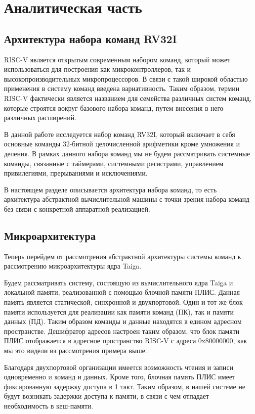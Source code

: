 \section{Аналитическая часть}

\subsection{Архитектура набора команд RV32I}
RISC-V является открытым современным набором команд, который может использоваться для построения как микроконтроллеров, так и высокопроизводительных микропроцессоров. В связи с такой широкой областью применения в систему команд введена вариативность. Таким образом, термин RISC-V фактически является названием для семейства различных систем команд, которые строятся вокруг базового набора команд, путем внесения в него различных расширений.

В данной работе исследуется набор команд RV32I, который включает в себя основные команды 32-битной целочисленной арифметики кроме умножения и деления. В рамках данного набора команд мы не будем рассматривать системные команды, связанные с таймерами, системными регистрами, управлением привилегиями, прерываниями и исключениями.

В настоящем разделе описывается архитектура набора команд, то есть архитектура абстрактной вычислительной машины с точки зрения набора команд без связи с конкретной аппаратной реализацией.

\subsection{Микроархитектура}
Теперь перейдем от рассмотрения абстрактной архитектуры системы команд к рассмотрению микроархитектуры ядра Taiga.

Будем рассматривать систему, состоящую из вычислительного ядра Taiga и локальной памяти, реализованной с помощью блочной памяти ПЛИС. Данная память является статической, синхронной и двухпортовой. Один и тот же блок памяти используется для реализации как памяти команд (ПК), так и памяти данных (ПД). Таким образом команды и данные находятся в едином адресном пространстве. Дешифратор адресов настроен таким образом, что блок памяти ПЛИС отображается в адресное пространство RISC-V с адреса 0x80000000, как мы это видели из рассмотрения примера выше.

Благодаря двухпортовой организации имеется возможность чтения и записи одновременно и команд и данных. Кроме того, блочная память ПЛИС имеет фиксированную задержку доступа в 1 такт. Таким образом, в нашей системе не будут возникать задержки доступа к памяти, в связи с чем отпадает необходимость в кеш-памяти.


